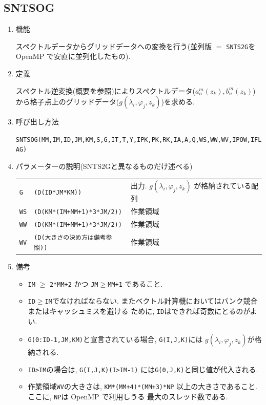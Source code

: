 \documentclass[a4j,fleqn]{jarticle}
\begin{document}
\subsection{SNTSOG}

\begin{enumerate}

\item 機能 

スペクトルデータからグリッドデータへの変換を行う(並列版 $=$
{\tt SNTS2G}をOpenMP で安直に並列化したもの).

\item 定義

スペクトル逆変換(概要を参照)によりスペクトルデータ($a^m_n(z_k),
b^m_n(z_k)$)
から格子点上のグリッドデータ($g(\lambda_i,\varphi_j,z_k)$)を求める.

\item 呼び出し方法 

{\tt SNTSOG(MM,IM,ID,JM,KM,S,G,IT,T,Y,IPK,PK,RK,IA,A,Q,WS,WW,WV,IPOW,IFLAG)}
  
\item パラメーターの説明(SNTS2Gと異なるものだけ述べる)

\begin{tabular}{lll}
{\tt G} & {\tt (D(ID*JM*KM))} & 出力. $g(\lambda_i,\varphi_j,z_k)$
	が格納されている配列\\
{\tt WS}  & {\tt (D(KM*(IM+MM+1)*3*JM/2))} & 作業領域\\
{\tt WW}  & {\tt (D(KM*(IM+MM+1)*3*JM/2))} & 作業領域\\
{\tt WV}  & {\tt (D(大きさの決め方は備考参照))} & 作業領域
\end{tabular}

\item 備考

\begin{itemize}

\item {\tt IM} $\ge$ {\tt 2*MM+2} かつ {\tt JM}$\ge${\tt MM+1}
    であること.

\item {\tt ID}$\ge${\tt IM}でなければならない.
   またベクトル計算機においてはバンク競合またはキャッシュミスを避ける
   ために, {\tt ID}はできれば奇数にとるのがよい.

\item {\tt G(0:ID-1,JM,KM)}と宣言されている場合, {\tt G(I,J,K)}には
    $g(\lambda_i,\varphi_j,z_k)$が格納される.

\item {\tt ID>IM}の場合は, {\tt G(I,J,K)(I>IM-1)}
    には{\tt G(0,J,K)}と同じ値が代入される. 

\item 作業領域{\tt WV}の大きさは, 
     {\tt KM*(MM+4)*(MM+3)*NP}
    以上の大きさであること. ここに, {\tt NP}は OpenMP で利用しうる
    最大のスレッド数である.

\end{itemize}

\end{enumerate}
\end{document}
